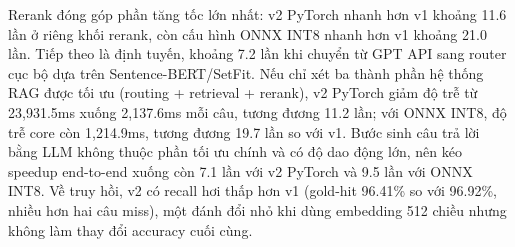 \documentclass[../DoAn.tex]{subfiles}
\begin{document}
\begin{table}[H]
    \centering
    \caption{Độ trễ trung bình theo thành phần (ms/câu)}
    \label{tab:e2e-latency}
    {\small
    \setlength{\tabcolsep}{6pt}
    }
\end{table}

Rerank đóng góp phần tăng tốc lớn nhất: v2 PyTorch nhanh hơn v1 khoảng 11.6 lần ở riêng khối rerank, còn cấu hình ONNX INT8 nhanh hơn v1 khoảng 21.0 lần. Tiếp theo là định tuyến, khoảng 7.2 lần khi chuyển từ GPT API sang router cục bộ dựa trên Sentence-BERT/SetFit. Nếu chỉ xét ba thành phần hệ thống RAG được tối ưu (routing + retrieval + rerank), v2 PyTorch giảm độ trễ từ 23,931.5ms xuống 2,137.6ms mỗi câu, tương đương 11.2 lần; với ONNX INT8, độ trễ core còn 1,214.9ms, tương đương 19.7 lần so với v1. Bước sinh câu trả lời bằng LLM không thuộc phần tối ưu chính và có độ dao động lớn, nên kéo speedup end-to-end xuống còn 7.1 lần với v2 PyTorch và 9.5 lần với ONNX INT8. Về truy hồi, v2 có recall hơi thấp hơn v1 (gold-hit 96.41\% so với 96.92\%, nhiều hơn hai câu miss), một đánh đổi nhỏ khi dùng embedding 512 chiều nhưng không làm thay đổi accuracy cuối cùng.
\end{document}
